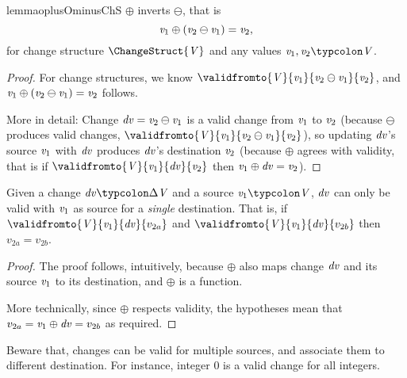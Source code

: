 \begin{restatable}{lemma}{oplusOminusChS}
  \label{thm:oplusOminusChS}
  \ensuremath{\oplus } inverts \ensuremath{\ominus }, that is
  \[\mathit{v}_{1}\oplus (\mathit{v}_{2}\ominus \mathit{v}_{1})\mathrel{=}\mathit{v}_{2},\] for change structure
  \ensuremath{\ChangeStruct{\Conid{V}}} and any values \ensuremath{\Varid{v}_{1},\Varid{v}_{2}\typcolon\Conid{V}}.
\end{restatable}
\begin{proof}
  For change structures, we know \ensuremath{\validfromto{\Conid{V}}{\Varid{v}_{1}}{\Varid{v}_{2}\ominus \Varid{v}_{1}}{\Varid{v}_{2}}}, and \ensuremath{\Varid{v}_{1}\oplus (\Varid{v}_{2}\ominus \Varid{v}_{1})\mathrel{=}\Varid{v}_{2}} follows.

  More in detail: Change \ensuremath{\Varid{dv}\mathrel{=}\Varid{v}_{2}\ominus \Varid{v}_{1}} is a valid change
  from \ensuremath{\Varid{v}_{1}} to \ensuremath{\Varid{v}_{2}} (because \ensuremath{\ominus } produces valid changes,
  \ensuremath{\validfromto{\Conid{V}}{\Varid{v}_{1}}{\Varid{v}_{2}\ominus \Varid{v}_{1}}{\Varid{v}_{2}}}), so updating \ensuremath{\Varid{dv}}'s source
  \ensuremath{\Varid{v}_{1}} with \ensuremath{\Varid{dv}} produces \ensuremath{\Varid{dv}}'s destination \ensuremath{\Varid{v}_{2}} (because
  \ensuremath{\oplus } agrees with validity, that is if \ensuremath{\validfromto{\Conid{V}}{\Varid{v}_{1}}{\Varid{dv}}{\Varid{v}_{2}}}
  then \ensuremath{\Varid{v}_{1}\oplus \Varid{dv}\mathrel{=}\Varid{v}_{2}}).
\end{proof}

\begin{lemma}
  Given a change \ensuremath{\Varid{dv}\typcolon\Delta \Conid{V}} and a source \ensuremath{\Varid{v}_{1}\typcolon\Conid{V}}, \ensuremath{\Varid{dv}} can only
  be valid with \ensuremath{\Varid{v}_{1}} as source for a \emph{single} destination.
  That is, if \ensuremath{\validfromto{\Conid{V}}{\Varid{v}_{1}}{\Varid{dv}}{v_{2a}}} and \ensuremath{\validfromto{\Conid{V}}{\Varid{v}_{1}}{\Varid{dv}}{v_{2b}}} then \ensuremath{v_{2a}\mathrel{=}v_{2b}}.
\end{lemma}
\begin{proof}
  The proof follows, intuitively, because \ensuremath{\oplus } also maps
  change \ensuremath{\Varid{dv}} and its source \ensuremath{\Varid{v}_{1}} to its destination, and
  \ensuremath{\oplus } is a function.

  More technically, since \ensuremath{\oplus } respects validity, the
  hypotheses mean that \ensuremath{v_{2a}\mathrel{=}\Varid{v}_{1}\oplus \Varid{dv}\mathrel{=}v_{2b}} as required.
\end{proof}
Beware that, changes can be valid for multiple sources, and associate
them to different destination. For instance, integer \ensuremath{\mathrm{0}} is a
valid change for all integers.

